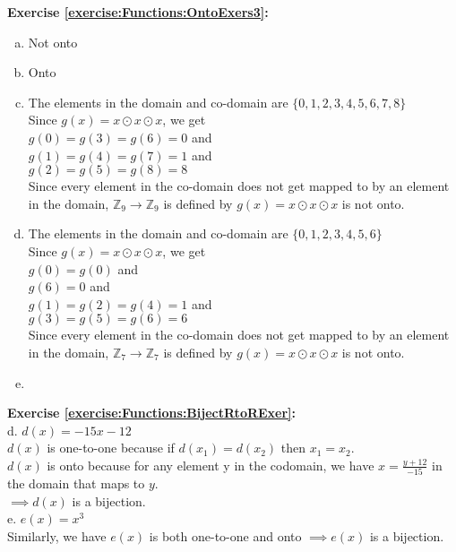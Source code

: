 \noindent\textbf{Exercise \ref{exercise:Functions:OntoExers3}:} %
\begin{enumerate}[(a)]
\item
Not onto
\item \label{modular_m3}
Onto
\item 
The elements in the domain and co-domain are $\{0,1,2,3,4,5,6,7,8\}$\\
Since $g(x)=x\odot x\odot x$, we get\\
$g(0)=g(3)=g(6)=0$ and\\ 
$g(1)=g(4)=g(7)=1$ and\\ 
$g(2)=g(5)=g(8)=8$\\        
Since every element in the co-domain does not get mapped to by an element in the domain, $\mathbb{Z}_{9}\to \mathbb{Z}_{9}$ is defined by $g(x)=x\odot x\odot x$ is not onto.

\item 
The elements in the domain and co-domain are $\{0,1,2,3,4,5,6\}$\\
Since $g(x)=x\odot x\odot x$, we get\\
$g(0)=g(0)$ and\\ 
$g(6)=0$ and\\ 
$g(1)=g(2)=g(4)=1$ and\\ 
$g(3)=g(5)=g(6)=6$\\
Since every element in the co-domain does not get mapped to by an element in the domain, $\mathbb{Z}_{7}\to \mathbb{Z}_{7}$ is defined by $g(x)=x\odot x\odot x$ is not onto.

\item 

\end{enumerate}



\noindent\textbf{Exercise \ref{exercise:Functions:BijectRtoRExer}:}\\
d. $d(x)=-15x-12$\\
$d(x)$ is one-to-one because if $d(x_1)=d(x_2)$ then $x_1=x_2$.\\
$d(x)$ is onto because for any element y in the codomain, we have $x=\displaystyle\frac{y+12}{-15}$ in the domain that maps to $y$.\\
$\implies d(x)$ is a bijection.\\
e. $e(x)=x^3$\\
Similarly, we have $e(x)$ is both one-to-one and onto $\implies e(x)$ is a bijection.\\

